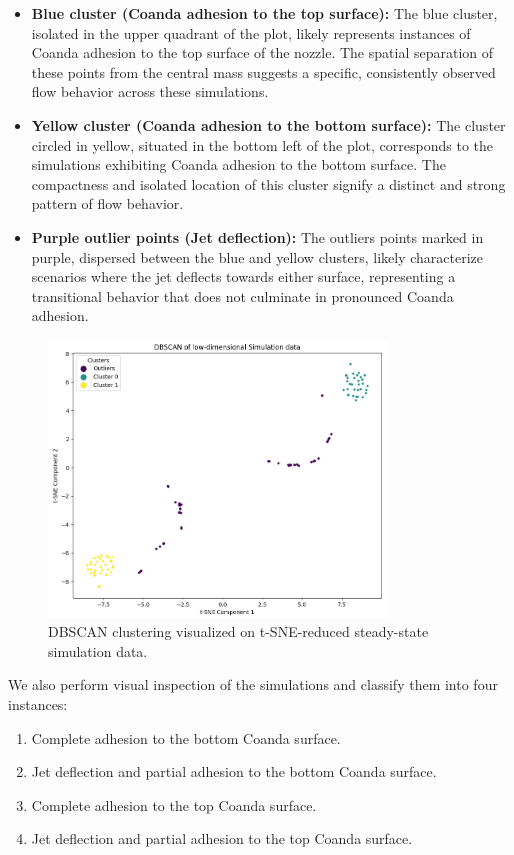 \begin{itemize}
  \item \textbf{Blue cluster (Coanda adhesion to the top surface):} The blue cluster, isolated in the upper quadrant of the plot, likely represents instances of Coanda adhesion to the top surface of the nozzle. The spatial separation of these points from the central mass suggests a specific, consistently observed flow behavior across these simulations.
  \item \textbf{Yellow cluster (Coanda adhesion to the bottom surface):} The cluster circled in yellow, situated in the bottom left of the plot, corresponds to the simulations exhibiting Coanda adhesion to the bottom surface. The compactness and isolated location of this cluster signify a distinct and strong pattern of flow behavior.
  \item \textbf{Purple outlier points (Jet deflection):} The outliers points marked in purple, dispersed between the blue and yellow clusters, likely characterize scenarios where the jet deflects towards either surface, representing a transitional behavior that does not culminate in pronounced Coanda adhesion.
\end{itemize}
\begin{figure}[ht]
    \centering
    \includegraphics[width=9cm]{images/Clustering/dbscan_tsne_sim.png}
    \caption{DBSCAN clustering visualized on t-SNE-reduced steady-state simulation data.}
    \label{dbscan_tsne}
\end{figure}
We also perform visual inspection of the simulations and classify them into four instances:  
\begin{enumerate}
    \item Complete adhesion to the bottom Coanda surface. 
    \item Jet deflection and partial adhesion to the bottom Coanda surface. 
    \item Complete adhesion to the top Coanda surface. 
    \item Jet deflection and partial adhesion to the top Coanda surface. 
\end{enumerate}
